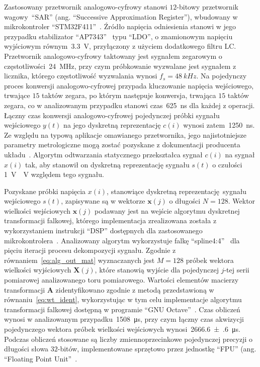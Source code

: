 Zastosowany przetwornik analogowo-cyfrowy stanowi $12$-bitowy przetwornik wagowy~\enquote{SAR} (ang. \enquote{Successive Approximation Register}), wbudowany w mikrokontroler \enquote{STM32F411}~\cite{stm_f411}. Źródło napięcia odniesienia stanowi w jego przypadku stabilizator \enquote{AP7343}~\cite{diodes_manual} typu \enquote{LDO}, o znamionowym napięciu wyjściowym równym~\qty{3.3}{V}, przyłączony z użyciem dodatkowego filtru LC. Przetwornik analogowo-cyfrowy taktowany jest sygnałem zegarowym o częstotliwości~\qty{24}{MHz}, przy czym próbkowanie wyzwalane jest sygnałem z licznika, którego częstotliwość wyzwalania wynosi $f_{s} = \qty{48}{kHz}$. Na pojedynczy proces konwersji analogowo-cyfrowej przypada kluczowanie napięcia wejściowego, trwające $15$ taktów zegara, po którym następuje konwersja, trwająca $15$ taktów zegara, co w analizowanym przypadku stanowi czas~\qty{625}{ns} dla każdej z operacji. Łączny czas konwersji analogowo-cyfrowej pojedynczej próbki sygnału wejściowego $y(t)$ na jego dyskretną reprezentację $c(i)$ wynosi zatem~\qty{1250}{ns}. Ze względu na typową aplikacje omawianego przetwornika, jego najistotniejsze parametry metrologiczne mogą zostać pozyskane z dokumentacji producenta układu~\cite{stm_f411}. Algorytm odtwarzania statycznego przekształca sygnał $c(i)$ na sygnał $x(i)$ tak, aby stanowił on dyskretną reprezentację sygnału $s(t)$ o czułości \qty{1}{V \per V} względem tego sygnału.

Pozyskane próbki napięcia $x(i)$, stanowiące dyskretną reprezentację sygnału wejściowego $s(t)$, zapisywane są w wektorze $\mathbf{x}(j)$ o długości $N = 128$. Wektor wielkości wejściowych $\mathbf{x}(j)$ podawany jest na wejście algorytmu dyskretnej transformacji falkowej, którego implementacja zrealizowana została z wykorzystaniem instrukcji \enquote{DSP} dostępnych dla zastosowanego mikrokontrolera~\cite{reay_dsp}. Analizowany algorytm wykorzystuje falkę \enquote{spline4:4}~\cite{wang_splinebasics} dla pięciu iteracji procesu dekompozycji sygnału. Zgodnie z równaniem~\eqref{eq:alg_out_mat} wyznaczanych jest $M = 128$ próbek wektora wielkości wyjściowych $\mathbf{X}(j)$, które stanowią wyjście dla pojedynczej $j$-tej serii pomiarowej analizowanego toru pomiarowego. Wartości elementów macierzy transformacji $\mathbf{A}$ zidentyfikowano zgodnie z metodą przedstawioną w równaniu~\eqref{eq:wt_ident}, wykorzystując w tym celu implementacje algorytmu transformacji falkowej dostępną w programie \enquote{GNU Octave}~\cite{pruuvsa_dwt}. Czas obliczeń wynosi w analizowanym przypadku~\qty{1508}{\micro s}, przy czym łączny czas akwizycji pojedynczego wektora próbek wielkości wejściowych wynosi~\qty{2666.6(6)}{\micro s}. Podczas obliczeń stosowane są liczby zmiennoprzecinkowe pojedynczej precyzji o długości słowa $32$-bitów, implementowane sprzętowo przez jednostkę \enquote{FPU} (ang. \enquote{Floating Point Unit}~\cite{cortex_fpu, gcc_manual}.

